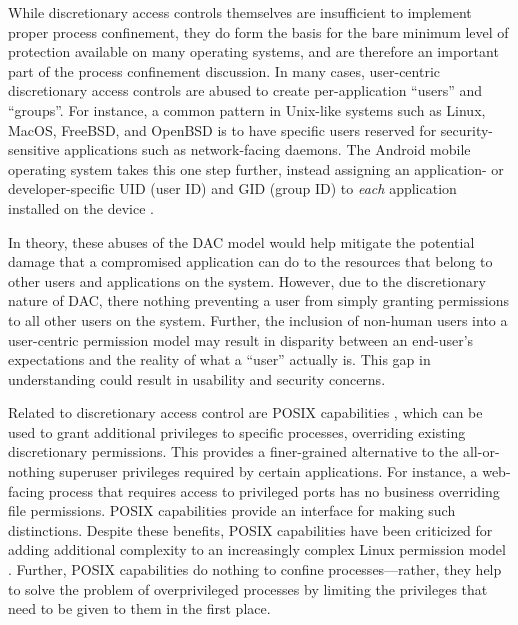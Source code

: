 \documentclass[dvipsnames, 12pt]{article}
\begin{document}
While discretionary access controls themselves are insufficient to implement
proper process confinement, they do form the basis for the bare minimum level of
protection available on many operating systems, and are therefore an important
part of the process confinement discussion. In many cases, user-centric
discretionary access controls are abused to create per-application
\enquote{users} and \enquote{groups}. For instance, a common pattern in
Unix-like systems such as Linux, MacOS, FreeBSD, and OpenBSD is to have specific
users reserved for security-sensitive applications such as network-facing
daemons. The Android mobile operating system takes this one step further,
instead assigning an application- or developer-specific UID (user ID) and GID
(group ID) to \textit{each} application installed on the device
\cite{android_security}.

In theory, these abuses of the DAC model would help mitigate the potential
damage that a compromised application can do to the resources that belong to
other users and applications on the system. However, due to the discretionary
nature of DAC, there nothing preventing a user from simply granting permissions
to all other users on the system. Further, the inclusion of non-human users into
a user-centric permission model may result in disparity between an end-user's
expectations and the reality of what a \enquote{user} actually is. This gap in
understanding could result in usability and security concerns.

Related to discretionary access control are POSIX capabilities
\cite{posix_capabilities,corbet2006_capabities_a,corbet2006_capabities_b}, which
can be used to grant additional privileges to specific processes, overriding
existing discretionary permissions. This provides a finer-grained alternative to
the all-or-nothing superuser privileges required by certain applications. For
instance, a web-facing process that requires access to privileged ports has no
business overriding file permissions. POSIX capabilities provide an interface
for making such distinctions. Despite these benefits, POSIX capabilities have
been criticized for adding additional complexity to an increasingly complex
Linux permission model \cite{corbet2006_capabities_b,corbet2006_capabities_a}.
Further, POSIX capabilities do nothing to confine processes---rather, they help
to solve the problem of overprivileged processes by limiting the privileges that
need to be given to them in the first place.
\end{document}
